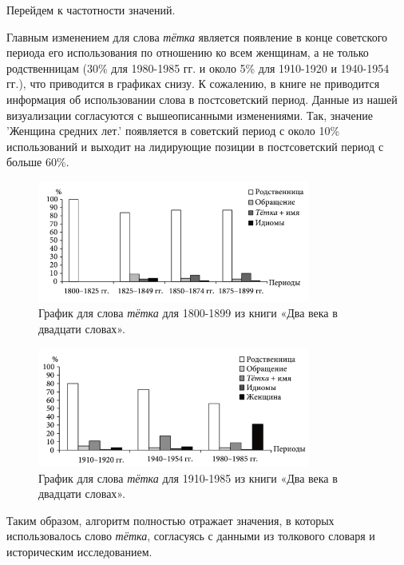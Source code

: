 Перейдем к частотности значений.

Главным изменением для слова \textit{тётка} является появление в конце советского периода
его использования по отношению ко всем женщинам, а не только родственницам (30\% для 1980-1985 гг.
и около 5\% для 1910-1920 и 1940-1954 гг.), что приводится в графиках снизу.
К сожалению, в книге не приводится информация об использовании слова в постсоветский период.
Данные из нашей визуализации согласуются с вышеописанными изменениями.
Так, значение ’Женщина средних лет.’ появляется в советский период с около 10\%
использований и выходит на лидирующие позиции в постсоветский период с больше 60\%.

\noindent %
\begin{figure}[H]
    \centering %
    \includegraphics[width=0.8\textwidth]{img/book/tetka/1800-1899}
    \caption{График для слова \textit{тётка} для 1800-1899 из книги «Два века в двадцати словах».}
\end{figure}

\begin{figure}[H]
    \centering %
    \includegraphics[width=0.8\textwidth]{img/book/tetka/1910-1985}
    \caption{График для слова \textit{тётка} для 1910-1985 из книги «Два века в двадцати словах».}
\end{figure}

Таким образом, алгоритм полностью отражает значения, в которых использовалось
слово \textit{тётка}, согласуясь с данными из толкового словаря и историческим исследованием.

